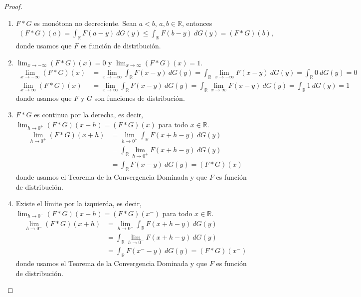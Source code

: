 \begin{proof}
    \begin{enumerate}
        \item $F*G$ es monótona no decreciente. Sean $a < b$, $a,b \in \mathbb{R}$, entonces
              \begin{align*}
                  (F*G)(a) = \int_{\mathbb{R}} F(a-y) \ dG(y) \leq \int_{\mathbb{R}} F(b-y) \ dG(y) = (F*G)(b),
              \end{align*}
              donde usamos que $F$ es función de distribución.
        \item $\lim_{x \to - \infty}(F*G)(x) = 0$ y $\lim_{x \to \infty}(F*G)(x) = 1$.
              \begin{align*}
                  \lim_{x \to -\infty} (F*G)(x) & = \lim_{x \to -\infty} \int_{\mathbb{R}} F(x-y) \ dG(y)  = \int_{\mathbb{R}} \lim_{x \to -\infty} F(x-y) \ dG(y)
                  = \int_{\mathbb{R}} 0 \ dG(y) = 0                                                                                                                \\
                  \lim_{x \to \infty} (F*G)(x)  & = \lim_{x \to \infty} \int_{\mathbb{R}} F(x-y) \ dG(y)  = \int_{\mathbb{R}} \lim_{x \to \infty} F(x-y) \ dG(y)
                  = \int_{\mathbb{R}} 1 \ dG(y) = 1
              \end{align*}
              donde usamos que $F$ y $G$ son funciones de distribución.
        \item $F*G$ es continua por la derecha, es decir, $\lim_{h \to 0^+}(F*G)(x+h) = (F*G)(x)$ para todo $x \in \mathbb{R}$.
              \begin{align*}
                  \lim_{h \to 0^+} (F*G)(x+h) & = \lim_{h \to 0^+} \int_{\mathbb{R}} F(x+h-y) \ dG(y) \\
                                              & = \int_{\mathbb{R}} \lim_{h \to 0^+} F(x+h-y) \ dG(y) \\
                                              & = \int_{\mathbb{R}} F(x-y) \ dG(y) = (F*G)(x)
              \end{align*}
              donde usamos el Teorema de la Convergencia Dominada y que $F$ es función de distribución.
        \item Existe el límite por la izquierda, es decir, $\lim_{h \to 0^-}(F*G)(x+h) = (F*G)(x^-)$ para todo $x \in \mathbb{R}$.
              \begin{align*}
                  \lim_{h \to 0^-} (F*G)(x+h) & = \lim_{h \to 0^-} \int_{\mathbb{R}} F(x+h-y) \ dG(y) \\
                                              & = \int_{\mathbb{R}} \lim_{h \to 0^-} F(x+h-y) \ dG(y) \\
                                              & = \int_{\mathbb{R}} F(x^--y) \ dG(y) = (F*G)(x^-)
              \end{align*}
              donde usamos el Teorema de la Convergencia Dominada y que $F$ es función de distribución.
    \end{enumerate}
\end{proof}

